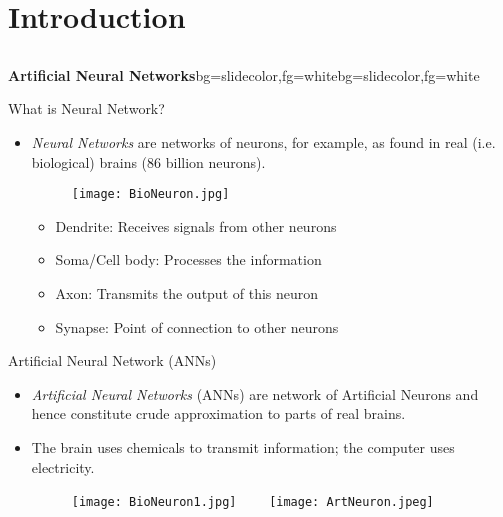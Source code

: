 \section{Introduction}
\subsection{}

\begin{frame}{}
\begin{variableblock}{\centering \Large \textbf{\vspace{4pt}\newline Artificial Neural Networks\vspace{4pt}}}{bg=slidecolor,fg=white}{bg=slidecolor,fg=white}
\end{variableblock}
\end{frame}

\begin{frame}{What is Neural Network?}
\begin{itemize}
\item \textit{\color{mycolor2}Neural Networks} are networks of neurons, for example, as found in real (i.e. biological) brains (86 billion neurons).
\begin{figure}
\texttt{[image: BioNeuron.jpg]}
\end{figure}
\begin{itemize}
\item {\color{mycolor3}Dendrite}: Receives signals from other neurons
\item {\color{mycolor3}Soma/Cell body}: Processes the information
\item {\color{mycolor3}Axon}: Transmits the output of this neuron
\item {\color{mycolor3}Synapse}: Point of connection to other neurons
\end{itemize}
\end{itemize}
\end{frame}

\begin{frame}{Artificial Neural Network (ANNs)}
\begin{itemize}
\item \textit{\color{mycolor2}Artificial Neural Networks} (ANNs) are network of Artificial Neurons and hence constitute crude approximation to parts of real brains.
\item The brain uses chemicals to transmit information; the computer uses electricity.
\begin{figure}
\texttt{[image: BioNeuron1.jpg]}~~~~
\texttt{[image: ArtNeuron.jpeg]}
\end{figure}
\end{itemize}
\end{frame}

